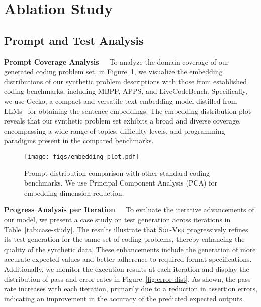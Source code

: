 \section{Ablation Study}
\subsection{Prompt and Test Analysis}
\textbf{Prompt Coverage Analysis}\ \ \ To analyze the domain coverage of our generated coding problem set, in Figure~\ref{fig:embedding-plot}, we visualize the embedding distributions of our synthetic problem descriptions with those from established coding benchmarks, including MBPP, APPS, and LiveCodeBench.
Specifically, we use Gecko, a compact and versatile text embedding model distilled from LLMs~\cite{lee2024gecko} for obtaining the sentence embeddings.
The embedding distribution plot reveals that our synthetic problem set exhibits a broad and diverse coverage, encompassing a wide range of topics, difficulty levels, and programming paradigms present in the compared benchmarks.

\begin{figure}[t]
    \centering
    \texttt{[image: figs/embedding-plot.pdf]}
    \caption{Prompt distribution comparison with other standard coding benchmarks. We use Principal Component Analysis (PCA) for embedding dimension reduction.}
    \label{fig:embedding-plot}
\end{figure}

\textbf{Progress Analysis per Iteration}\ \ \ To evaluate the iterative advancements of our model, we present a case study on test generation across iterations in Table~\ref{tab:case-study}. The results illustrate that \textsc{Sol-Ver} progressively refines its test generation for the same set of coding problems, thereby enhancing the quality of the synthetic data. These enhancements include the generation of more accurate expected values and better adherence to required format specifications.
Additionally, we monitor the execution results at each iteration and display the distribution of pass and error rates in Figure~\ref{fig:error-dist}. As shown, the pass rate increases with each iteration, primarily due to a reduction in assertion errors, indicating an improvement in the accuracy of the predicted expected outputs.

